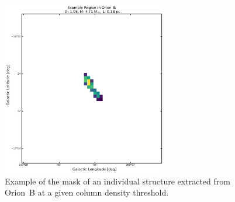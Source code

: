 \begin{figure}[h]
    \centering
    \includegraphics[width=0.64\textwidth]{figures/MSD_Gallery_Orion_B_5.png}
    \caption{Example of the mask of an individual structure extracted from Orion~B at a given column density threshold.}
    \label{fig:gallery_MSD_B_5}
\end{figure}

